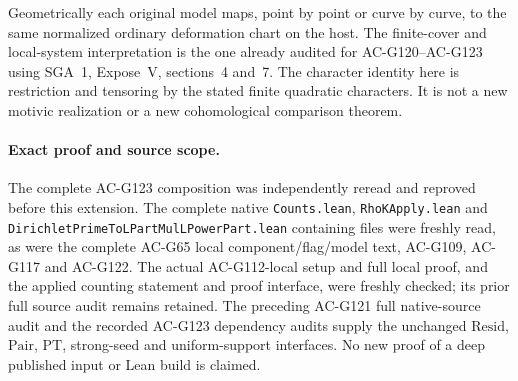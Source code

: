 Geometrically each original model maps, point by point or curve
by curve, to the same normalized ordinary deformation chart on
the host.  The finite-cover and local-system interpretation is
the one already audited for AC-G120--AC-G123 using SGA~1,
Expose~V, sections~4 and~7.  The character identity here is
restriction and tensoring by the stated finite quadratic
characters.  It is not a new motivic realization or a new
cohomological comparison theorem.

\paragraph{Exact proof and source scope.}
The complete AC-G123 composition was independently reread and
reproved before this extension.  The complete native
\texttt{Counts.lean}, \texttt{RhoKApply.lean} and
\texttt{DirichletPrimeToLPartMulLPowerPart.lean} containing
files were freshly read, as were the complete AC-G65 local
component/flag/model text, AC-G109, AC-G117 and AC-G122.
The actual AC-G112-local setup and full local proof, and the
applied counting statement and proof interface, were freshly
checked; its prior full source audit remains retained.
The preceding AC-G121 full native-source audit and the
recorded AC-G123 dependency audits supply the unchanged
\(\mathrm{Resid}\), \(\mathrm{Pair}\), \(\mathrm{PT}\),
strong-seed and uniform-support interfaces.  No new proof
of a deep published input or Lean build is claimed.

